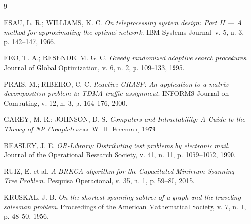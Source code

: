 \documentclass[12pt, a4paper]{article}
\begin{document}
\begin{thebibliography}{9}

ESAU, L. R.; WILLIAMS, K. C.
\textit{On teleprocessing system design: Part II --- A method for approximating the optimal network}.
IBM Systems Journal, v. 5, n. 3, p. 142--147, 1966.

FEO, T. A.; RESENDE, M. G. C.
\textit{Greedy randomized adaptive search procedures}.
Journal of Global Optimization, v. 6, n. 2, p. 109--133, 1995.

PRAIS, M.; RIBEIRO, C. C.
\textit{Reactive GRASP: An application to a matrix decomposition problem in TDMA traffic assignment}.
INFORMS Journal on Computing, v. 12, n. 3, p. 164--176, 2000.

GAREY, M. R.; JOHNSON, D. S.
\textit{Computers and Intractability: A Guide to the Theory of NP-Completeness}.
W. H. Freeman, 1979.

BEASLEY, J. E.
\textit{OR-Library: Distributing test problems by electronic mail}.
Journal of the Operational Research Society, v. 41, n. 11, p. 1069--1072, 1990.

RUIZ, E. et al.
\textit{A BRKGA algorithm for the Capacitated Minimum Spanning Tree Problem}.
Pesquisa Operacional, v. 35, n. 1, p. 59--80, 2015.

KRUSKAL, J. B.
\textit{On the shortest spanning subtree of a graph and the traveling salesman problem}.
Proceedings of the American Mathematical Society, v. 7, n. 1, p. 48--50, 1956.

\end{thebibliography}
\end{document}
